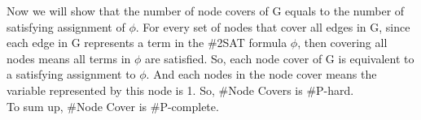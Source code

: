 \documentclass[12pt]{article}
\begin{document}
Now we will show that the number of node covers of G equals to the
number of satisfying assignment of $\phi$. For every set of nodes that
cover all edges in G, since each edge in G represents a term in the
\#2SAT formula $\phi$, then covering all nodes means all terms in
$\phi$ are satisfied. So, each node cover of G is equivalent to a
satisfying assignment to $\phi$. And each nodes in the node cover
means the variable represented by this node is 1. So, \#Node Covers is
\#P-hard. \\

To sum up, \#Node Cover is \#P-complete.
\end{document}
